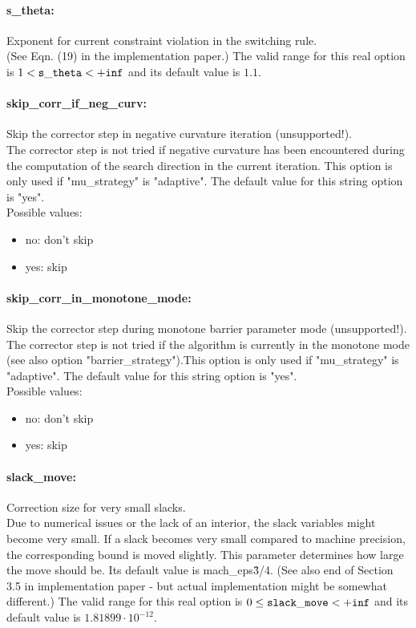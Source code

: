\paragraph{s\_theta:}\label{opt:s_theta} Exponent for current constraint violation in the switching rule. \\
 (See Eqn. (19) in the implementation paper.) The valid range for this real option is 
$1 <  {\tt s\_theta } <  {\tt +inf}$
and its default value is $1.1$.


\paragraph{skip\_corr\_if\_neg\_curv:}\label{opt:skip_corr_if_neg_curv} Skip the corrector step in negative curvature iteration (unsupported!). \\
 The corrector step is not tried if negative curvature has been encountered during the computation of the search direction in the current iteration. This option is only used if "mu\_strategy" is "adaptive". The default value for this string option is "yes".
\\ 
Possible values:
\begin{itemize}
   \item no: don't skip
   \item yes: skip
\end{itemize}

\paragraph{skip\_corr\_in\_monotone\_mode:}\label{opt:skip_corr_in_monotone_mode} Skip the corrector step during monotone barrier parameter mode (unsupported!). \\
 The corrector step is not tried if the algorithm is currently in the monotone mode (see also option "barrier\_strategy").This option is only used if "mu\_strategy" is "adaptive". The default value for this string option is "yes".
\\ 
Possible values:
\begin{itemize}
   \item no: don't skip
   \item yes: skip
\end{itemize}

\paragraph{slack\_move:}\label{opt:slack_move} Correction size for very small slacks. \\
 Due to numerical issues or the lack of an interior, the slack variables might become very small.  If a slack becomes very small compared to machine precision, the corresponding bound is moved slightly.  This parameter determines how large the move should be.  Its default value is mach\_eps\^{3/4}.  (See also end of Section 3.5 in implementation paper - but actual implementation might be somewhat different.) The valid range for this real option is 
$0 \le {\tt slack\_move } <  {\tt +inf}$
and its default value is $1.81899 \cdot 10^{-12}$.


